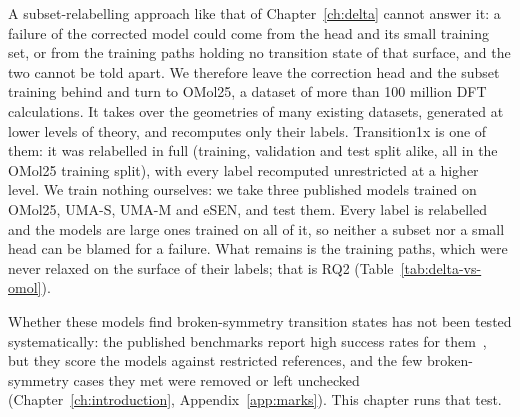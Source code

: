 A subset-relabelling approach like that of Chapter~\ref{ch:delta}
cannot answer it: a failure of
the corrected model could come from the head and its small training
set, or from the training paths holding no transition state of that
surface, and the two cannot be told apart. We therefore leave the
correction head and the subset training behind and turn to OMol25, a
dataset of more than 100 million DFT calculations. It takes over the
geometries of many existing datasets, generated at lower levels of
theory, and recomputes only their labels. Transition1x is one of them:
it was relabelled in full (training, validation and test split alike,
all in the OMol25 training split), with every label recomputed
unrestricted at a higher level. We train nothing ourselves: we take three published
models trained on OMol25, UMA-S, UMA-M and eSEN, and test them. Every
label is relabelled and the models are large ones trained on all of it,
so neither a subset nor a small head can be blamed for a failure. What
remains is the training paths, which were never relaxed on the surface
of their labels; that is RQ2 (Table~\ref{tab:delta-vs-omol}).

\begin{table}[H]
\centering
\small
\caption{The two relabelling setups of this thesis. The Transition1x
paths are in both, unchanged; everything else is stronger in the
second.}
\label{tab:delta-vs-omol}
\end{table}

Whether these models find broken-symmetry transition states has not
been tested systematically: the published benchmarks report high
success rates for them~\cite{marks2026, hait2025}, but they score the
models against restricted references, and the few broken-symmetry cases
they met were removed or left unchecked
(Chapter~\ref{ch:introduction}, Appendix~\ref{app:marks}). This chapter
runs that test.

